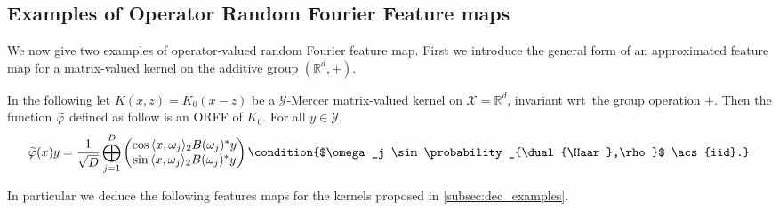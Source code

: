 \documentclass[twoside,11pt]{article}
\begin{document}
\subsection{Examples of Operator Random Fourier Feature maps}
\label{subsec:examples_ORFF} We now give two examples of operator-valued random
Fourier feature map. First we introduce the general form of an approximated
feature map for a matrix-valued kernel on the additive group
$(\mathbb{R}^d,+)$.
\begin{example}
    \label{ex:additive_group} In the following let $K(x,z)=K_0(x-z)$ be a
    $\mathcal{Y}$-Mercer matrix-valued kernel on $\mathcal{X}=\mathbb{R}^d$,
    invariant \acs{wrt}~the group operation $+$. Then the function
    $\tildePhi{\omega}$ defined as follow is an \acl{ORFF} of $K_{0}$.
    For all $y\in\mathcal{Y}$,
    \begin{dmath*}
        \tildePhi{\omega}(x)y=\frac{1}{\sqrt{D}}\Vect_{j=1}^D
        \begin{pmatrix}
            \cos{\inner{x,\omega_j}_2}B(\omega_j)^\adjoint y \\
            \sin{\inner{x,\omega_j}_2}B(\omega_j)^\adjoint y
        \end{pmatrix}
        \condition{$\omega_j \sim \probability_{\dual{\Haar},\rho}$
        \acs{iid}.}
    \end{dmath*}
\end{example}
In particular we deduce the following features maps for the kernels proposed in
\cref{subsec:dec_examples}.
\end{document}
